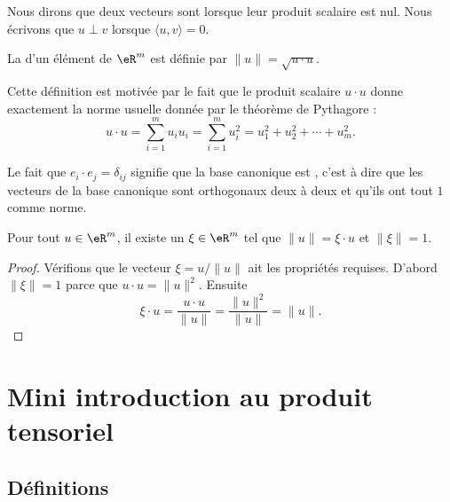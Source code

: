 Nous dirons que deux vecteurs sont  lorsque leur produit scalaire est nul. Nous écrivons que $u\perp v$ lorsque $\langle u, v\rangle =0$.
\begin{definition}	\label{DefNormeEucleApp}
	La  d'un élément de $\eR^m$ est définie par $\| u \|=\sqrt{u\cdot u}$.
\end{definition}

Cette définition est motivée par le fait que le produit scalaire $u\cdot u$ donne exactement la norme usuelle donnée par le théorème de Pythagore :
\begin{equation}
	u\cdot u=\sum_{i=1}^mu_iu_i=\sum_{i=1}^m u_i^2=u_1^2+u_2^2+\cdots+u_m^2.
\end{equation}

Le fait que $e_i\cdot e_j=\delta_{ij}$ signifie que la base canonique est , c'est à dire que les vecteurs de la base canonique sont orthogonaux deux à deux et qu'ils ont tout $1$ comme norme.

\begin{lemma}\label{LemSclNormeXi}
	Pour tout $u\in\eR^m$, il existe un $\xi\in\eR^m$ tel que $\| u \|=\xi\cdot u$ et $\| \xi \|=1$.
\end{lemma}

\begin{proof}
	Vérifions que le vecteur $\xi=u/\| u \|$ ait les propriétés requises. D'abord $\| \xi \|=1$ parce que $u\cdot u=\| u \|^2$. Ensuite
	\begin{equation}
		\xi\cdot u=\frac{ u\cdot u }{ \| u \| }=\frac{ \| u \|^2 }{ \| u \| }=\| u \|.
	\end{equation}
\end{proof}

\section{Mini introduction au produit tensoriel}
\label{SeOOpHsn}

\subsection{Définitions}

